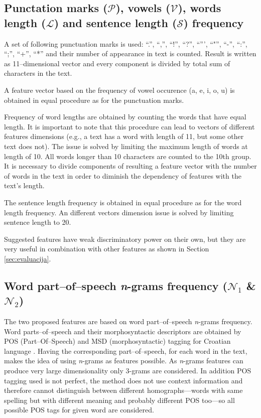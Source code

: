 \documentclass[11pt,english]{article}
\begin{document}
\begin{multicols}{2}
\subsection{Punctation marks ($\mathcal{P}$), vowels ($\mathcal{V}$), words
length ($\mathcal{L}$) and sentence length ($\mathcal{S}$) frequency}
\label{sec:znacajke-manje}
A set of following punctuation marks is used: ``.'', ``,'', ``!'', ``?'',
``''', ``"'', ``-'', ``:'', ``;'', ``+'', ``*'' and their number of appearance in
text is counted. Result is written as 11--dimensional vector and every
component is divided by total sum of characters in the text.

A feature vector based on the frequency of vowel occurence (a, e, i, o, u) is
obtained in equal procedure as for the punctuation marks.

Frequency of word lengths are obtained by counting the words that have equal
length. It is important to note that this procedure can lead to vectors of
different features dimensions (e.g., a text has a word with length of 11,
but some other text does not). The issue is solved by limiting the maximum
length of words at length of 10. All words longer than 10 characters are
counted to the 10th group. It is necessary to divide components of resulting a feature
vector with the number of words in the text in order to diminish the dependency
of features with the text's length.

The sentence length frequency is obtained in equal procedure as for the word
length frequency. An different vectors dimension issue is solved by limiting
sentence length to 20.

Suggested features have weak discriminatory power on their own, but they are
very useful in combination with other features as shown in Section \ref{sec:evaluacija}.

\subsection{Word part--of--speech \emph{n}-grams frequency ($\mathcal{N}_1$ \&
$\mathcal{N}_2$)}
\label{sec:ngrami-tipova}
The two proposed features are based on word part--of--speech \emph{n}-grams
frequency. Word parts--of--speech and their morphosyntactic descriptors are obtained by POS
(Part--Of--Speech) and MSD (morphosyntactic) tagging for Croatian language
\citep{snajder08automatic}. Having the corresponding part--of--speech, for
each word in the text, makes the idea of using \emph{n}-grams as features
possible. As \emph{n}-grams features can produce very large dimensionality 
only 3-grams are considered. In addition POS tagging used is not perfect, the
method does not use context information and therefore cannot distinguish between
different homographs---words with same spelling but with different meaning and probably
different POS too---so all possible POS tags for given word are considered.


\end{multicols}
\end{document}

